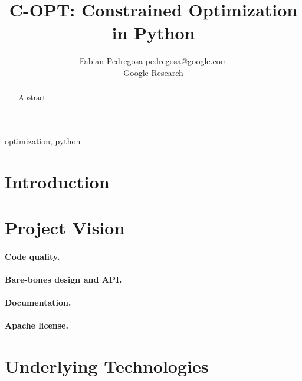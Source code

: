 \documentclass[twoside,11pt]{article}
\begin{document}
\title{C-OPT: Constrained Optimization in Python}
\author{\name Fabian Pedregosa \email pedregosa@google.com \\
       \addr Google Research\\
}
\editor{}


\maketitle


\begin{abstract}
Abstract
\end{abstract}

\begin{keywords}
  optimization, python
\end{keywords}

\section{Introduction}


\section{Project Vision}

\paragraph{Code quality.}

\paragraph{Bare-bones design and API.}

\paragraph{Documentation.}

\paragraph{Apache license.}


\section{Underlying Technologies}

\citep{virtanen2019scipy}

\citep{pedregosa2011scikit}


\end{document}
